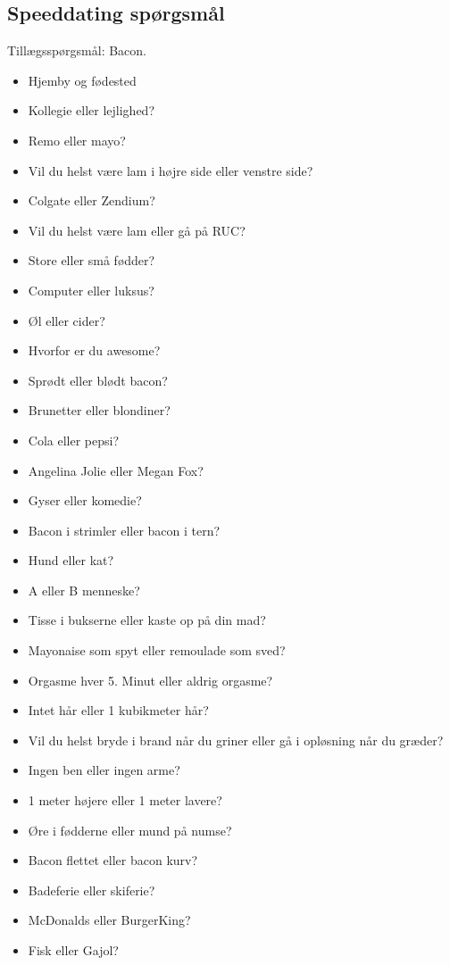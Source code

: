 \subsection*{Speeddating spørgsmål}
Tillægsspørgsmål: Bacon.
\begin{itemize}
  \item Hjemby og fødested
  \item Kollegie eller lejlighed?
  \item Remo eller mayo?
  \item Vil du helst være lam i højre side eller venstre side?
  \item Colgate eller Zendium?
  \item Vil du helst være lam eller gå på RUC?
  \item Store eller små fødder?
  \item Computer eller luksus?
  \item Øl eller cider?
  \item Hvorfor er du awesome?
  \item Sprødt eller blødt bacon?
  \item Brunetter eller blondiner?
  \item Cola eller pepsi? 
  \item Angelina Jolie eller Megan Fox? 
  \item Gyser eller komedie? 
  \item Bacon i strimler eller bacon i tern? 
  \item Hund eller kat? 
  \item A eller B menneske? 
  \item Tisse i bukserne eller kaste op på din mad? 
  \item Mayonaise som spyt eller remoulade som sved? 
  \item Orgasme hver 5. Minut eller aldrig orgasme?
  \item Intet hår eller 1 kubikmeter hår? 
  \item Vil du helst bryde i brand når du griner eller gå i opløsning når du græder? 
  \item Ingen ben eller ingen arme? 
  \item 1 meter højere eller 1 meter lavere? 
  \item Øre i fødderne eller mund på numse? 
  \item Bacon flettet eller bacon kurv? 
  \item Badeferie eller skiferie? 
  \item McDonalds eller BurgerKing? 
  \item Fisk eller Gajol? 

\end{itemize}
